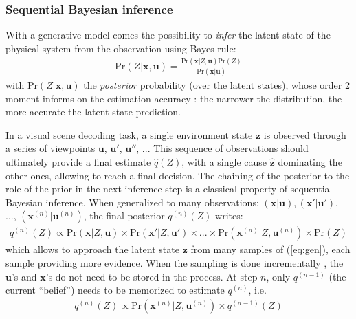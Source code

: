 \documentclass[12pt,twoside,openright]{article}
\begin{document}
\subsubsection{Sequential Bayesian inference}\label{sec:seq-bayes}


With a generative model comes the possibility to \emph{infer} the latent state of the physical system {\color{Purple} from the observation}
using Bayes rule:
\begin{align}
\text{Pr}(Z|\boldsymbol{x},\boldsymbol{u})
= \frac{\text{Pr}(\boldsymbol{x}|Z, \boldsymbol{u}) \text{Pr}(Z)}
{\text{Pr}(\boldsymbol{x}|\boldsymbol{u})}\label{eq:post-Pr}
\end{align}
with $\text{Pr}(Z|\boldsymbol{x},\boldsymbol{u})$ the \emph{posterior} probability
(over the latent states), whose order 2 moment informs on the estimation accuracy : the narrower the distribution, the more accurate the latent state prediction. 

{\color{Purple} In a visual scene decoding task, a single environment state $\boldsymbol{z}$ is
observed through a series of viewpoints $\boldsymbol{u}$, $\boldsymbol{u}'$, $\boldsymbol{u}''$, ... This sequence of observations should ultimately provide a final estimate $\hat{q}(Z)$, with a single cause $\hat{\boldsymbol{z}}$ dominating the other ones, allowing to reach a final decision. }
The chaining of the posterior to the role of the prior in the next inference step is a classical property of sequential Bayesian inference.
When generalized to many observations: $(\boldsymbol{x}|\boldsymbol{u}), (\boldsymbol{x}'|\boldsymbol{u}')$, ..., $(\boldsymbol{x}^{(n)}|\boldsymbol{u}^{(n)})$, the final posterior $q^{(n)}(Z)$ writes:
\begin{align}
q^{(n)}(Z) \propto \text{Pr}(\boldsymbol{x}|Z,\boldsymbol{u}) \times \text{Pr}(\boldsymbol{x}'|Z,\boldsymbol{u}') \times ... \times \text{Pr}(\boldsymbol{x}^{(n)}|Z,\boldsymbol{u}^{(n)}) \times \text{Pr}(Z) \label{eq:accum}
\end{align}
which allows to approach the latent state $\boldsymbol{z}$ from many samples of (\ref{eq:gen}), each sample providing more evidence. 
{\color{Purple} When the sampling is done incrementally \citep{wald1945sequential},}
the $\boldsymbol{u}$'s and $\boldsymbol{x}$'s do not need to be stored in the process. At step $n$, only $q^{(n-1)}$ (the current ``belief'') needs to be memorized to estimate $q^{(n)}$, i.e. 
\begin{align} 
q^{(n)}(Z) \propto \text{Pr}(\boldsymbol{x}^{(n)}|Z,\boldsymbol{u}^{(n)}) \times q^{(n-1)}(Z) \label{eq:accum-post}
\end{align}
\end{document}

